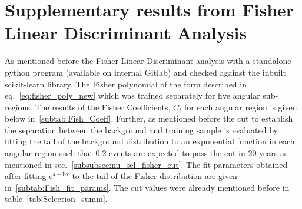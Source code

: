 \chapter{Supplementary results from Fisher Linear Discriminant Analysis}
\label{sec:app_4}

As mentioned before the Fisher Linear Discriminant analysis with a standalone python program (available on internal Gitlab) and checked against the inbuilt scikit-learn library. The Fisher polynomial of the form described in eq.~\ref{eq:fisher_poly_new} which was trained separately for five angular sub-regions. The results of the Fisher Coefficients, $C_i$ for each angular region is given below in~\ref{subtab:Fish_Coeff}. 
Further, as mentioned before the cut to establish the separation between the background and training sample is evaluated by fitting the tail of the background distribution to an exponential function in each angular region such that 0.2 events are expected to pass the cut in 20 years as mentioned in sec.~\ref{subsubsec:nu_sel_fisher_cut}. The fit parameters obtained after fitting $\mathrm{e^{a-bx}}$ to the tail of the Fisher distribution are given in~\ref{subtab:Fish_fit_params}. The cut values were already mentioned before in table~\ref{tab:Selection_summ}.


